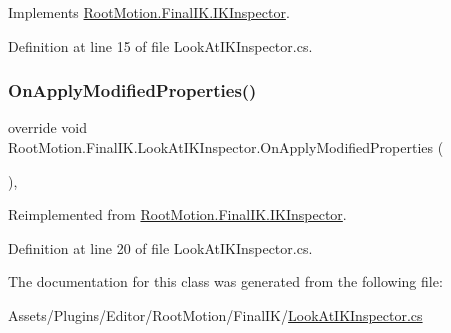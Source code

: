 Implements \mbox{\hyperlink{class_root_motion_1_1_final_i_k_1_1_i_k_inspector_a4c4528d5f5ce9af9e30c049138a5a5ca}{Root\+Motion.\+Final\+I\+K.\+I\+K\+Inspector}}.



Definition at line 15 of file Look\+At\+I\+K\+Inspector.\+cs.

\mbox{\label{class_root_motion_1_1_final_i_k_1_1_look_at_i_k_inspector_ad277b6a27244d6d7f71323ff324411a7}} 
\subsubsection{\texorpdfstring{On\+Apply\+Modified\+Properties()}{OnApplyModifiedProperties()}}
{\footnotesize\ttfamily override void Root\+Motion.\+Final\+I\+K.\+Look\+At\+I\+K\+Inspector.\+On\+Apply\+Modified\+Properties (\begin{DoxyParamCaption}{ }\end{DoxyParamCaption})\hspace{0.3cm}{\ttfamily [protected]}, {\ttfamily [virtual]}}



Reimplemented from \mbox{\hyperlink{class_root_motion_1_1_final_i_k_1_1_i_k_inspector_a2909376aa17c40b7d7577761165d1c67}{Root\+Motion.\+Final\+I\+K.\+I\+K\+Inspector}}.



Definition at line 20 of file Look\+At\+I\+K\+Inspector.\+cs.



The documentation for this class was generated from the following file\+:\begin{DoxyCompactItemize}
\item 
Assets/\+Plugins/\+Editor/\+Root\+Motion/\+Final\+I\+K/\mbox{\hyperlink{_look_at_i_k_inspector_8cs}{Look\+At\+I\+K\+Inspector.\+cs}}\end{DoxyCompactItemize}
